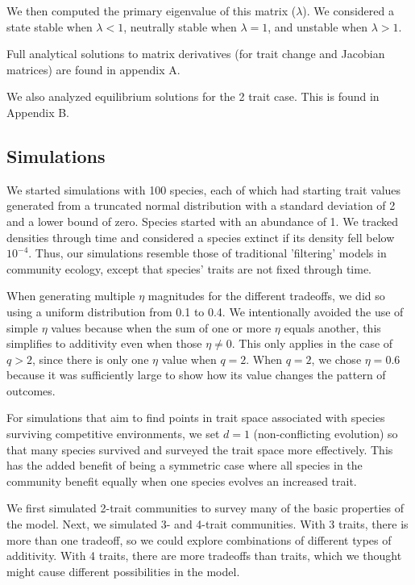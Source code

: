 \noindent We then computed the primary eigenvalue of this matrix ($\lambda$).
We considered a state stable when $\lambda < 1$,
neutrally stable when $\lambda = 1$,
and unstable when $\lambda > 1$.

Full analytical solutions to matrix derivatives (for trait change and
Jacobian matrices) are found in appendix A.

We also analyzed equilibrium solutions for the 2 trait case.
This is found in Appendix B.





\subsection*{Simulations}

We started simulations with 100 species, each of which
had starting trait values generated from a truncated normal distribution 
with a standard deviation of 2 and a lower bound of zero.
Species started with an abundance of 1.
We tracked densities through time and considered a species extinct if its 
density fell below $10^{-4}$.
Thus, our simulations resemble those of traditional 'filtering' models
in community ecology, 
except that species' traits are not fixed through time.

When generating multiple $\eta$ magnitudes for the different tradeoffs,
we did so using a uniform distribution from 0.1 to 0.4.
We intentionally avoided the use of simple $\eta$ values because
when the sum of one or more $\eta$ equals another, this simplifies
to additivity even when those $\eta \ne 0$.
This only applies in the case of $q > 2$, since there is only one
$\eta$ value when $q = 2$.
When $q = 2$, we chose $\eta = 0.6$ because it was sufficiently large
to show how its value changes the pattern of outcomes.

For simulations that aim to find points in trait space associated with
species surviving competitive environments, we set $d = 1$ 
(non-conflicting evolution) so that many species
survived and surveyed the trait space more effectively.
This has the added benefit of being a symmetric case where
all species in the community benefit equally when one
species evolves an increased trait.


We first simulated 2-trait communities to survey many of the
basic properties of the model.
Next, we simulated 3- and 4-trait communities.
With 3 traits, there is more than one tradeoff, so we could
explore combinations of different types of additivity.
With 4 traits, there are more tradeoffs than traits, which we
thought might cause different possibilities in the model.



